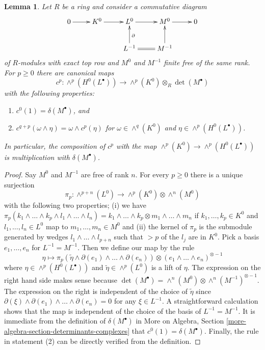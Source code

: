 \documentclass[10pt,a4paper]{amsart}
\theoremstyle{plain}
\newtheorem{lemma}[subsection]{Lemma}
\theoremstyle{definition}
\theoremstyle{remark}
\numberwithin{equation}{subsection}
\begin{document}
\begin{lemma}
\label{lemma-funny-map}
Let $R$ be a ring and consider a commutative diagram
$$
\xymatrix{
0 \ar[r] &
K^0 \ar[r] &
L^0 \ar[r] &
M^0 \ar[r] & 0 \\
& & L^{-1} \ar[u]_\partial \ar@{=}[r] &
M^{-1} \ar[u]
}
$$
of $R$-modules with exact top row and $M^0$ and $M^{-1}$
finite free of the same rank. For $p \geq 0$ there are canonical maps
$$
c^p : 
\wedge^p(H^0(L^\bullet))
\longrightarrow
\wedge^p(K^0) \otimes_R \det(M^\bullet)
$$
with the following properties:
\begin{enumerate}
\item $c^0(1) = \delta(M^\bullet)$, and
\item $c^{q + p}(\omega \wedge \eta) = \omega \wedge c^p(\eta)$
for $\omega \in \wedge^q(K^0)$ and $\eta \in \wedge^p(H^0(L^\bullet))$.
\end{enumerate}
In particular, the composition of $c^p$ with the map
$\wedge^p(K^0) \to \wedge^p(H^0(L^\bullet))$ is multiplication
with $\delta(M^\bullet)$.
\end{lemma}

\begin{proof}
Say $M^0$ and $M^{-1}$ are free of rank $n$. For every $p \geq 0$
there is a unique surjection
$$
\pi_p :
\wedge^{p + n}(L^0)
\longrightarrow
\wedge^p(K^0) \otimes \wedge^n(M^0)
$$
with the following two properties; (i) we have
$
\pi_p(k_1 \wedge \ldots \wedge k_p \wedge l_1 \wedge \ldots \wedge l_n) =
k_1 \wedge \ldots \wedge k_p \otimes
m_1 \wedge \ldots \wedge m_n
$
if $k_1, \ldots, k_p \in K^0$ and $l_1, \ldots, l_n \in L^0$ map
to $m_1, \ldots, m_n \in M^0$ and (ii) the kernel of $\pi_p$ is the
submodule generated by wedges
$l_1 \wedge \ldots \wedge l_{p + n}$ such that $> p$ of the
$l_j$ are in $K^0$. Pick a basis $e_1, \ldots, e_n$ for $L^{-1} = M^{-1}$.
Then we define our map by the rule
$$
\eta \mapsto
\pi_p(\tilde \eta \wedge \partial(e_1) \wedge \ldots \wedge \partial(e_n))
\otimes (e_1 \wedge \ldots \wedge e_n)^{\otimes -1}
$$
where $\eta \in \wedge^p(H^0(L^\bullet))$ and $\tilde \eta \in \wedge^p(L^0)$
is a lift of $\eta$. The expression on the right hand side makes sense because
$\det(M^\bullet) = \wedge^n(M^0) \otimes \wedge^n(M^{-1})^{\otimes -1}$.
The expression on the right is independent of the choice of $\tilde \eta$ since
$\partial(\xi) \wedge \partial(e_1) \wedge \ldots \wedge \partial(e_n) = 0$
for any $\xi \in L^{-1}$. A straightforward calculation shows that the map
is independent of the choice of the basis of $L^{-1} = M^{-1}$.
It is immediate from the definition of $\delta(M^\bullet)$ in
More on Algebra, Section \ref{more-algebra-section-determinants-complexes}
that $c^0(1) = \delta(M^\bullet)$. Finally, the rule in statement (2)
can be directly verified from the definition.
\end{proof}
\end{document}
